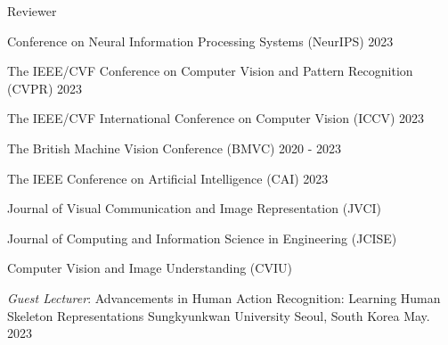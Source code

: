 


\begin{cventries}

\cvpub
{Reviewer} %
{ %
\begin{cvitems}
    \item {Conference on Neural Information Processing Systems (NeurIPS) 2023}
    \item {The IEEE/CVF Conference on Computer Vision and Pattern Recognition (CVPR) 2023}
    \item {The IEEE/CVF International Conference on Computer Vision (ICCV) 2023}
    \item {The British Machine Vision Conference (BMVC) 2020 - 2023}
    \item {The IEEE Conference on Artificial Intelligence (CAI) 2023}
    \item {Journal of Visual Communication and Image Representation (JVCI)}
    \item {Journal of Computing and Information Science in Engineering (JCISE)}
    \item {Computer Vision and Image Understanding (CVIU)}
\end{cvitems}
}
\end{cventries}

\vspace{.5em}

\cventry
{\textit{Guest Lecturer}: Advancements in Human Action Recognition: Learning Human Skeleton Representations}
{Sungkyunkwan University}
{Seoul, South Korea}
{May. 2023}
{}
\vspace{-1em}


